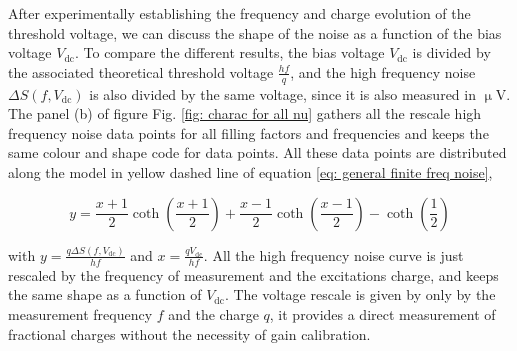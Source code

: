 After experimentally establishing the frequency and charge evolution of the threshold voltage, we can discuss the shape of the noise as a function of the bias voltage $V_{\mathrm{dc}}$.
To compare the different results, the bias voltage $V_{\mathrm{dc}}$ is divided by the associated theoretical threshold voltage $\frac{hf}{q}$, and the high frequency noise $\Delta S\left(f,V_{\mathrm{dc}}\right)$ is also divided by the same voltage, since it is also measured in $\upmu$V.
The panel (b) of figure Fig. \ref{fig: charac for all nu} gathers all the rescale high frequency noise data points for all filling factors and frequencies and keeps the same colour and shape code for data points.
All these data points are distributed along the model in yellow dashed line of equation \eqref{eq: general finite freq noise},

\begin{equation}
y = \frac{x+1}{2}\coth\left(\frac{x+1}{2}\right)+\frac{x-1}{2}\coth\left(\frac{x-1}{2}\right)-\coth\left(\frac{1}{2}\right) \label{eq: general finite freq noise}
\end{equation}

with $y = \frac{q\Delta S\left(f,V_{\mathrm{dc}}\right)}{hf}$ and $x = \frac{qV_{\mathrm{dc}}}{hf}$.
All the high frequency noise curve is just rescaled by the frequency of measurement and the excitations charge, and keeps the same shape as a function of $V_{\mathrm{dc}}$.
The voltage rescale is given by only by the measurement frequency $f$ and the charge $q$, it provides a direct measurement of fractional charges without the necessity of gain calibration.




